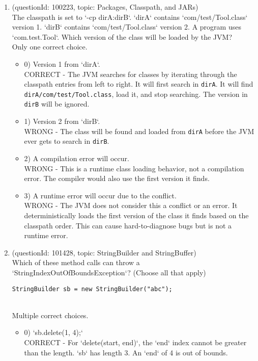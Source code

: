 \documentclass[12pt]{article}
\begin{document}
\begin{enumerate}[label=(\arabic*)]
\begin{itemize}
\end{itemize}
\item (questionId: 100223, topic: Packages, Classpath, and JARs) \\ 
The classpath is set to `-cp dirA:dirB`. `dirA` contains `com/test/Tool.class` version 1. `dirB` contains `com/test/Tool.class` version 2. A program uses `com.test.Tool`. Which version of the class will be loaded by the JVM?
\\ \noindent Only one correct choice. 
\begin{itemize}
\item 0) Version 1 from `dirA`.
 \\ 
CORRECT - The JVM searches for classes by iterating through the classpath entries from left to right. It will first search in \verb|dirA|. It will find \verb|dirA/com/test/Tool.class|, load it, and stop searching. The version in \verb|dirB| will be ignored.

\item 1) Version 2 from `dirB`.
 \\ 
WRONG - The class will be found and loaded from \verb|dirA| before the JVM ever gets to search in \verb|dirB|.

\item 2) A compilation error will occur.
 \\ 
WRONG - This is a runtime class loading behavior, not a compilation error. The compiler would also use the first version it finds.

\item 3) A runtime error will occur due to the conflict.
 \\ 
WRONG - The JVM does not consider this a conflict or an error. It deterministically loads the first version of the class it finds based on the classpath order. This can cause hard-to-diagnose bugs but is not a runtime error.

\end{itemize}
\item (questionId: 101428, topic: StringBuilder and StringBuffer) \\ 
Which of these method calls can throw a `StringIndexOutOfBoundsException`? (Choose all that apply)
\begin{verbatim}
StringBuilder sb = new StringBuilder("abc");
\end{verbatim}
\\ \noindent Multiple correct choices. 
\begin{itemize}
\item 0) `sb.delete(1, 4);`
 \\ 
CORRECT - For `delete(start, end)`, the `end` index cannot be greater than the length. `sb` has length 3. An `end` of 4 is out of bounds.


\end{itemize}
\end{enumerate}
\end{document}
